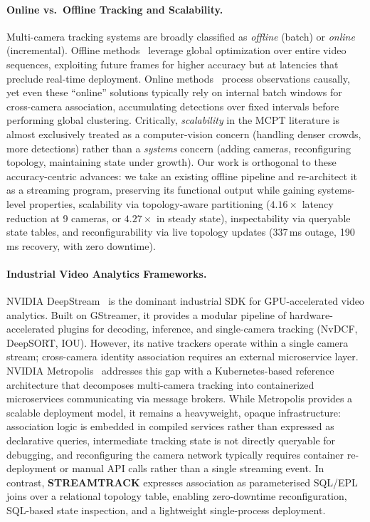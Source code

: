 \documentclass[review]{elsarticle}
\begin{document}
\paragraph{Online vs.\ Offline Tracking and Scalability.}
Multi-camera tracking systems are broadly classified as \emph{offline} (batch) or \emph{online} (incremental). Offline methods~\cite{yoshida2024overlap} leverage global optimization over entire video sequences, exploiting future frames for higher accuracy but at latencies that preclude real-time deployment. Online methods~\cite{kim2024cluster,xie2024robust,specker2024ocmctrack} process observations causally, yet even these ``online'' solutions typically rely on internal batch windows for cross-camera association, accumulating detections over fixed intervals before performing global clustering. Critically, \emph{scalability} in the MCPT literature is almost exclusively treated as a computer-vision concern (handling denser crowds, more detections) rather than a \emph{systems} concern (adding cameras, reconfiguring topology, maintaining state under growth). Our work is orthogonal to these accuracy-centric advances: we take an existing offline pipeline and re-architect it as a streaming program, preserving its functional output while gaining systems-level properties, scalability via topology-aware partitioning ($4.16\times$ latency reduction at 9 cameras, or $4.27\times$ in steady state), inspectability via queryable state tables, and reconfigurability via live topology updates (337\,ms outage, 190\,ms recovery, with zero downtime).

\paragraph{Industrial Video Analytics Frameworks.}
NVIDIA DeepStream~\cite{nvidia2024deepstream} is the dominant industrial SDK for GPU-accelerated video analytics. Built on GStreamer, it provides a modular pipeline of hardware-accelerated plugins for decoding, inference, and single-camera tracking (NvDCF, DeepSORT, IOU). However, its native trackers operate within a single camera stream; cross-camera identity association requires an external microservice layer. NVIDIA Metropolis~\cite{nvidia2025metropolis} addresses this gap with a Kubernetes-based reference architecture that decomposes multi-camera tracking into containerized microservices communicating via message brokers. While Metropolis provides a scalable deployment model, it remains a heavyweight, opaque infrastructure: association logic is embedded in compiled services rather than expressed as declarative queries, intermediate tracking state is not directly queryable for debugging, and reconfiguring the camera network typically requires container re-deployment or manual API calls rather than a single streaming event. In contrast, \textbf{STREAMTRACK} expresses association as parameterised SQL/EPL joins over a relational topology table, enabling zero-downtime reconfiguration, SQL-based state inspection, and a lightweight single-process deployment.
\end{document}
